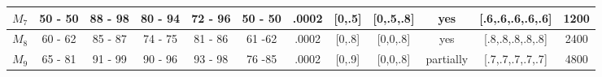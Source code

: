 \begin{table}[H]
{\begin{tabular}{|c|c|c|c|c|c|c|c|c|c|c|c|}
\rowcolor[HTML]{FFFFFF} 
$M_{7}$                                                                              & 50 - 50                                 & 88 - 98                                 & 80 - 94                                 & 72 - 96                                 & 50 - 50                                 & .0002                                                                                   & {[}0,.5{]}                                                                                  & {[}0,.5,.8{]}                                                                              & yes                                                                                       & {[}.6,.6,.6,.6,.6{]}                                                                    & 1200                                                                                      \\ \hline
\rowcolor[HTML]{FFFFFF} 
$M_{8}$                                                                              & 60 - 62                                 & 85 - 87                                 & 74 - 75                                 & 81 - 86                                 & 61 -62                                  & .0002                                                                                   & {[}0,.8{]}                                                                                  & {[}0,0,.8{]}                                                                               & yes                                                                                       & {[}.8,.8,.8,.8,.8{]}                                                                    & 2400                                                                                      \\ \hline
\rowcolor[HTML]{FFFFFF} 
$M_{9}$                                                                              & 65 - 81                                 & 91 - 99                                 & 90 - 96                                 & 93 - 98                                 & 76 -85                                  & .0002                                                                                   & {[}0,.9{]}                                                                                  & {[}0,0,.8{]}                                                                               & partially                                                                                 & {[}.7,.7,.7,.7,.7{]}                                                                    & 4800                                                                                      \\ \hline

\end{tabular}}
\end{table}
